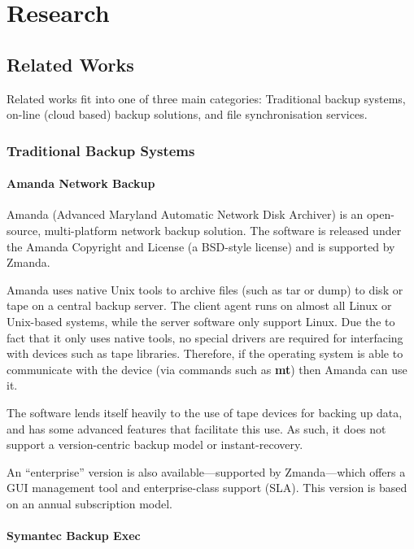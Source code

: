 \section{Research}

\begin{bibunit}[plain]

\subsection{Related Works}

Related works fit into one of three main categories: Traditional backup
systems, on-line (cloud based) backup solutions, and file synchronisation
services.

\subsubsection{Traditional Backup Systems}

\paragraph{Amanda Network Backup}

Amanda (Advanced Maryland Automatic Network Disk Archiver) is an open-source,
multi-platform network backup solution. The software is released under the
Amanda Copyright and License (a BSD-style license) and is supported by Zmanda.

Amanda uses native Unix tools to archive files (such as tar or dump) to disk or
tape on a central backup server. The client agent runs on almost all Linux or
Unix-based systems, while the server software only support Linux. Due the to
fact that it only uses native tools, no special drivers are required for
interfacing with devices such as tape libraries. Therefore, if the operating
system is able to communicate with the device (via commands such as
\textbf{mt}) then Amanda can use it.

The software lends itself heavily to the use of tape devices for backing up
data, and has some advanced features that facilitate this use. As such, it does
not support a version-centric backup model or instant-recovery.

An ``enterprise'' version is also available---supported by Zmanda---which
offers a GUI management tool and enterprise-class support (SLA).  This version
is based on an annual subscription model.

\paragraph{Symantec Backup Exec}


\end{bibunit}
